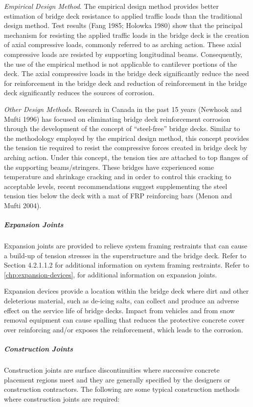 \emph{Empirical Design Method}. The empirical design method provides better estimation of bridge deck resistance to
applied traffic loads than the traditional design method. Test results (Fang 1985; Holowka 1980) show that the
principal mechanism for resisting the applied traffic loads in the bridge deck is the creation of axial compressive
loads, commonly referred to as arching action. These axial compressive loads are resisted by supporting longitudinal
beams. Consequently, the use of the empirical method is not applicable to cantilever portions of the deck. The axial
compressive loads in the bridge deck significantly reduce the need for reinforcement in the bridge deck and reduction
of reinforcement in the bridge deck significantly reduces the sources of corrosion.

\emph{Other Design Methods}. Research in Canada in the past 15 years (Newhook and Mufti 1996) has focused on
eliminating bridge deck reinforcement corrosion through the development of the concept of “steel-free” bridge decks.
Similar to the methodology employed by the empirical design method, this concept provides the tension tie required
to resist the compressive forces created in bridge deck by arching action. Under this concept, the tension ties are
attached to top flanges of the supporting beams/stringers. These bridges have experienced some temperature and
shrinkage cracking and in order to control this cracking to acceptable levels, recent recommendations suggest
supplementing the steel tension ties below the deck with a mat of FRP reinforcing bars (Menon and Mufti 2004).

\subparagraph{Expansion Joints}
Expansion joints are provided to relieve system framing restraints that can cause a build-up of tension stresses in the superstructure and the bridge deck. Refer to Section 4.2.1.1.2 for additional information on system framing restraints. Refer to \cref{chp:expansion-devices}, for additional information on expansion joints.

Expansion devices provide a location within the bridge deck where dirt and other deleterious material, such as de-icing salts, can collect and produce an adverse effect on the service life of bridge decks. Impact from vehicles and from snow removal equipment can cause spalling that reduces the protective concrete cover over reinforcing and/or exposes the reinforcement, which leads to the corrosion.

\subparagraph{Construction Joints}
Construction joints are surface discontinuities where successive concrete placement regions meet and they are generally specified by the designers or construction contractors. The following are some typical construction methods where construction joints are required:

